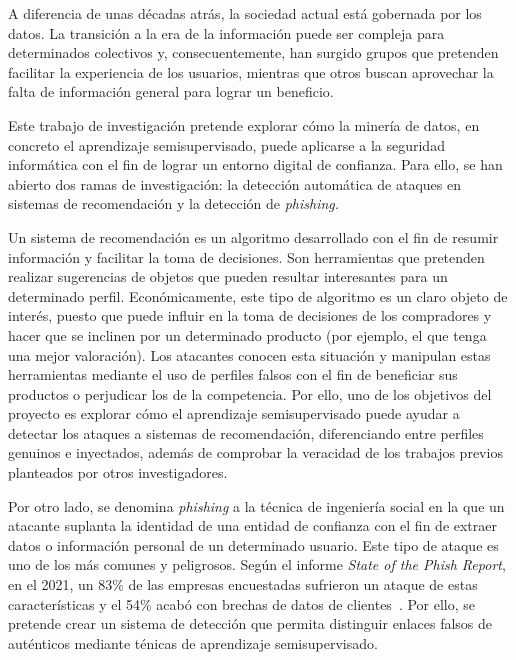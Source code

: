 
A diferencia de unas décadas atrás, la sociedad actual está gobernada por los datos. La transición a la era de la información puede ser compleja para determinados colectivos y, consecuentemente, han surgido grupos que pretenden facilitar la experiencia de los usuarios, mientras que otros buscan aprovechar la falta de información general para lograr un beneficio.

Este trabajo de investigación pretende explorar cómo la minería de datos, en concreto el aprendizaje semisupervisado, puede aplicarse a la seguridad informática con el fin de lograr un entorno digital de confianza. Para ello, se han abierto dos ramas de investigación: la detección automática de ataques en sistemas de recomendación y la detección de \textit{phishing.}

Un sistema de recomendación es un algoritmo desarrollado con el fin de resumir información y facilitar la toma de decisiones. Son herramientas que pretenden realizar sugerencias de objetos que pueden resultar interesantes para un determinado perfil. Económicamente, este tipo de algoritmo es un claro objeto de interés, puesto que puede influir en la toma de decisiones de los compradores y hacer que se inclinen por un determinado producto (por ejemplo, el que tenga una mejor valoración). Los atacantes conocen esta situación y manipulan estas herramientas mediante el uso de perfiles falsos con el fin de beneficiar sus productos o perjudicar los de la competencia. Por ello, uno de los objetivos del proyecto es explorar cómo el aprendizaje semisupervisado puede ayudar a detectar los ataques a sistemas de recomendación, diferenciando entre perfiles genuinos e inyectados, además de comprobar la veracidad de los trabajos previos planteados por otros investigadores.

Por otro lado, se denomina \textit{phishing} a la técnica de ingeniería social en la que un atacante suplanta la identidad de una entidad de confianza con el fin de extraer datos o información personal de un determinado usuario. Este tipo de ataque es uno de los más comunes y peligrosos. Según el informe \textit{State of the Phish Report}, en el 2021, un 83\% de las empresas encuestadas sufrieron un ataque de estas características y el 54\% acabó con brechas de datos de clientes~\cite{phishingPorcentajeExito}. Por ello, se pretende crear un sistema de detección que permita distinguir enlaces falsos de auténticos mediante ténicas de aprendizaje semisupervisado.

